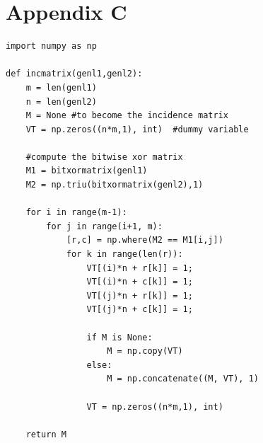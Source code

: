 \documentclass{stats_apa_style2}
\begin{document}
\section*{Appendix C}
\label{app: C}
\begin{lstlisting}
import numpy as np
 
def incmatrix(genl1,genl2):
    m = len(genl1)
    n = len(genl2)
    M = None #to become the incidence matrix
    VT = np.zeros((n*m,1), int)  #dummy variable
 
    #compute the bitwise xor matrix
    M1 = bitxormatrix(genl1)
    M2 = np.triu(bitxormatrix(genl2),1) 
 
    for i in range(m-1):
        for j in range(i+1, m):
            [r,c] = np.where(M2 == M1[i,j])
            for k in range(len(r)):
                VT[(i)*n + r[k]] = 1;
                VT[(i)*n + c[k]] = 1;
                VT[(j)*n + r[k]] = 1;
                VT[(j)*n + c[k]] = 1;
 
                if M is None:
                    M = np.copy(VT)
                else:
                    M = np.concatenate((M, VT), 1)
 
                VT = np.zeros((n*m,1), int)
 
    return M
\end{lstlisting}
\end{document}
